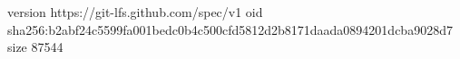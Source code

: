 version https://git-lfs.github.com/spec/v1
oid sha256:b2abf24c5599fa001bedc0b4c500cfd5812d2b8171daada0894201dcba9028d7
size 87544
